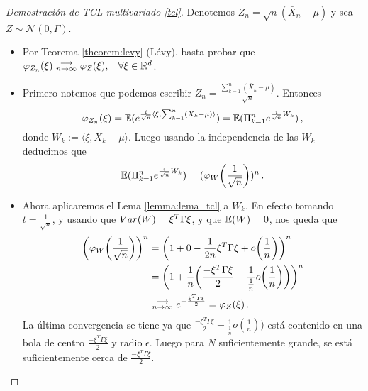 \begin{proof}[Demostración de TCL multivariado \ref{tcl}]
\gris Denotemos $Z_n = \sqrt{n}(\bar{X}_n-\mu)$ y sea $Z\sim\mathcal{N}(0,\Gamma)$. 
\begin{itemize}
    \item Por Teorema \ref{theorem:levy} (Lévy), basta probar que $\varphi_{Z_n}(\xi)\mbox{ }\substack{\longrightarrow \\ n\to\infty}\mbox{ } \varphi_Z(\xi), \hspace{.25cm}\, \forall\xi\in\mathbb{R}^d$.
    \item Primero notemos que podemos escribir $Z_n=\displaystyle \frac{\sum^n_{k=1}(\bar{X}_k-\mu)}{\sqrt{n}}$. Entonces %
    $$\displaystyle\varphi_{Z_n}(\xi) = \displaystyle \mathbb{E}(e^{\frac{i}{\sqrt{n}}\langle\xi,\sum^n_{k=1}(X_k-\mu)\rangle})=\displaystyle\mathbb{E}(\Pi^n_{k=1}e^{\frac{i}{\sqrt{n}}W_k}) \, ,$$
    donde $W_k:=\langle\xi,X_k-\mu\rangle$. Luego usando la independencia de las $W_k$ deducimos que 
    $$ \displaystyle\mathbb{E}(\Pi^n_{k=1}e^{\frac{i}{\sqrt{n}}W_k}) = (\varphi_W\bigg(\frac{1}{\sqrt{n}}\bigg))^n  \, .$$
    \item Ahora aplicaremos el Lema \ref{lemma:lema_tcl} a $W_k$. En efecto tomando $t=\frac{1}{\sqrt{n}}$, y usando que $Var(W)=\xi^T\Gamma\xi$, y que $\mathbb{E}(W)=0$, nos queda que
    \begin{alignat*}{2}
        \bigg(\varphi_W\bigg(\frac{1}{\sqrt{n}}\bigg)\bigg)^n & = \bigg(1+0-\frac{1}{2n}\xi^T\Gamma\xi+o\bigg(\frac{1}{n}\bigg)\bigg)^n \\
         & = \bigg(1+\frac{1}{n}\bigg(\frac{-\xi^T\Gamma\xi}{2}+\frac{1}{\frac{1}{n}}o\bigg(\frac{1}{n}\bigg)\bigg)\bigg)^n \\
         & \mbox{ }\substack{\longrightarrow \\ n\to\infty}\mbox{ } e^{-\frac{\xi^T\Gamma\xi}{2}}=\varphi_Z(\xi)  \, .
    \end{alignat*}
    La última convergencia se tiene ya que $\frac{-\xi^T\Gamma\xi}{2}+\frac{1}{\frac{1}{n}}o(\frac{1}{n}))$ está contenido en una bola de centro $\frac{-\xi^T\Gamma\xi}{2}$ y radio $\epsilon$. Luego para $N$ suficientemente grande, se está suficientemente cerca de $\frac{-\xi^T\Gamma\xi}{2}$.  %
\end{itemize}
\findem \negro
\end{proof}